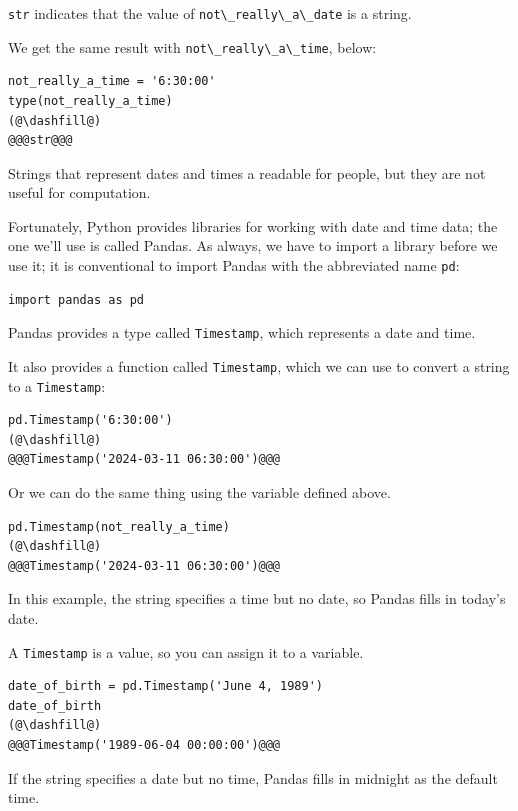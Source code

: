 \passthrough{\lstinline!str!} indicates that the value of
\passthrough{\lstinline!not\_really\_a\_date!} is a string.

We get the same result with
\passthrough{\lstinline!not\_really\_a\_time!}, below:

\begin{lstlisting}[]
not_really_a_time = '6:30:00'
type(not_really_a_time)
(@\dashfill@)
@@@str@@@
\end{lstlisting}

Strings that represent dates and times a readable for people, but they
are not useful for computation.

Fortunately, Python provides libraries for working with date and time
data; the one we'll use is called Pandas. As always, we have to import a
library before we use it; it is conventional to import Pandas with the
abbreviated name \passthrough{\lstinline!pd!}:

\begin{lstlisting}[]
import pandas as pd
\end{lstlisting}

Pandas provides a type called \passthrough{\lstinline!Timestamp!}, which
represents a date and time.

It also provides a function called \passthrough{\lstinline!Timestamp!},
which we can use to convert a string to a
\passthrough{\lstinline!Timestamp!}:

\begin{lstlisting}[]
pd.Timestamp('6:30:00')
(@\dashfill@)
@@@Timestamp('2024-03-11 06:30:00')@@@
\end{lstlisting}

Or we can do the same thing using the variable defined above.

\begin{lstlisting}[]
pd.Timestamp(not_really_a_time)
(@\dashfill@)
@@@Timestamp('2024-03-11 06:30:00')@@@
\end{lstlisting}

In this example, the string specifies a time but no date, so Pandas
fills in today's date.

A \passthrough{\lstinline!Timestamp!} is a value, so you can assign it
to a variable.

\begin{lstlisting}[]
date_of_birth = pd.Timestamp('June 4, 1989')
date_of_birth
(@\dashfill@)
@@@Timestamp('1989-06-04 00:00:00')@@@
\end{lstlisting}

If the string specifies a date but no time, Pandas fills in midnight as
the default time.

